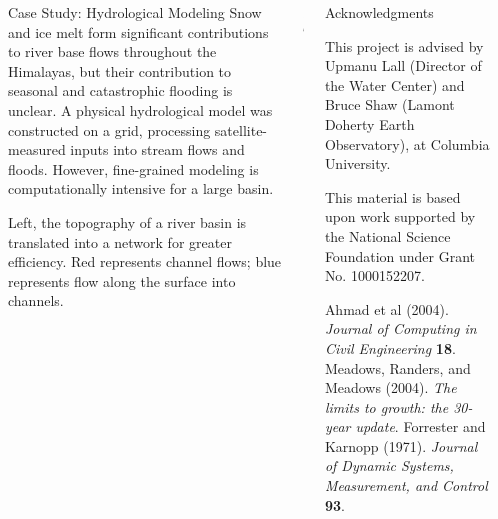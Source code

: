 \documentclass[final]{beamer}
\newlength{\sepwid}
\newlength{\onecolwid}
\newlength{\twocolwid}
\begin{document}
\begin{frame}[fragile]
\begin{columns}[t]
\begin{column}{\twocolwid}
\begin{block}{Case Study: Hydrological Modeling}
        Snow and ice melt form significant contributions to river base
        flows throughout the Himalayas, but their contribution to
        seasonal and catastrophic flooding is unclear.  A physical
        hydrological model was constructed on a grid, processing
        satellite-measured inputs into stream flows and floods.
        However, fine-grained modeling is computationally intensive
        for a large basin.

        \vspace{.5cm}
        Left, the topography of a river basin is
        translated into a network for greater efficiency.  Red
        represents channel flows; blue represents flow along the
        surface into channels.
      \end{block}

    \end{column}

    \begin{column}{.7\sepwid}\end{column}			%

    \begin{column}{\onecolwid}

      \begin{block}{Acknowledgments}

        \begin{small}
          This project is advised by Upmanu Lall (Director of the
          Water Center) and Bruce Shaw (Lamont Doherty Earth
          Observatory), at Columbia University.

          This material is based upon work supported by the National
          Science Foundation under Grant No. 1000152207.

       \begin{thebibliography}{99}
           Ahmad et al (2004). \textit{Journal of Computing in Civil Engineering} \textbf{18}.
           Meadows, Randers, and Meadows (2004). \textit{The limits to growth: the 30-year update}.
           Forrester and Karnopp (1971). \textit{Journal of Dynamic Systems, Measurement, and Control} \textbf{93}.
          \end{thebibliography}
          \end{small}

      \end{block}

    \end{column}

    \begin{column}{1\sepwid}\end{column}			%

  \end{columns}

\end{frame}
\end{document}
